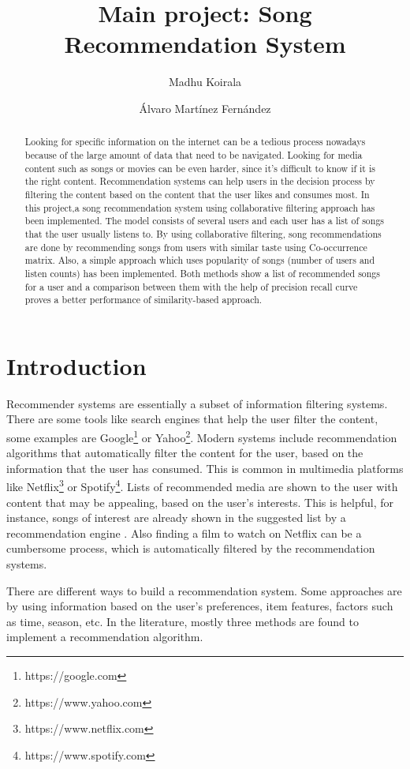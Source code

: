 \documentclass{jot}
\title{Main project: Song Recommendation System}
\author[affiliation=UiT, nowrap]
    {Madhu Koirala}
    {is a master student in Computer Science at the University of Troms\o. You can contact him at \email{mko075@uit.no}.}
\author[affiliation=UiT, nowrap]
    {\'{A}lvaro Mart\'{i}nez Fern\'{a}ndez}
    { is a master student in Computer Science at the University of Troms\o. You can contact him at \email{afe026@uit.no}.}
\affiliation{UiT}{University of Troms\o, Norway\\
\url{https://uit.no/startsida}}
\begin{document}
\begin{abstract}
Looking for specific information on the internet can be a tedious process nowadays because of the large amount of data that need to be navigated. Looking for media content such as songs or movies can be even harder, since it’s difficult to know if it is the right content. Recommendation systems can help users in the decision process by filtering the content based on the content that the user likes and consumes most. In this project,a song recommendation system using collaborative filtering approach has been implemented. The model consists of several users and each user has a list of songs that the user usually listens to. By using collaborative filtering, song recommendations are done by recommending songs from users with similar taste using Co-occurrence matrix. Also, a simple approach which uses popularity of songs (number of users and listen counts) has been implemented. Both methods show a list of recommended songs for a user and a comparison between them with the help of precision recall curve proves a better performance of similarity-based approach.
\end{abstract}


\tableofcontents

\section{Introduction}
Recommender systems are essentially a subset of information filtering systems. There are some tools like search engines that help the user filter the content, some examples are Google\footnote{https://google.com} or Yahoo\footnote{https://www.yahoo.com}. Modern systems include recommendation algorithms that automatically filter the content for the user, based on the information that the user has consumed. This is  common in multimedia platforms like Netflix\footnote{https://www.netflix.com} or Spotify\footnote{https://www.spotify.com}. Lists of recommended media are shown to the user with content that may be appealing, based on the user’s interests. This is helpful, for instance, songs of interest are already shown in the suggested list by a recommendation engine . Also finding a film to watch on Netflix can be a cumbersome process, which is automatically filtered by the recommendation systems.

There are different ways to build a recommendation system. Some approaches are by using information based on the user’s preferences, item features, factors such as time, season, etc. In the literature, mostly  three methods are found to implement a recommendation algorithm.
\end{document}
